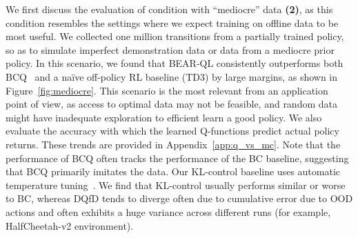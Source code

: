 We first discuss the evaluation of condition with ``mediocre'' data \textbf{(2)}, as this condition resembles the settings where we expect training on offline data to be most useful. We collected one million transitions from a partially trained policy, so as to simulate imperfect demonstration data or data from a mediocre prior policy.
In this scenario, we found that BEAR-QL consistently outperforms both BCQ~\cite{fujimoto2018off} and a na\"ive off-policy RL baseline (TD3) by large margins, as shown in Figure~\ref{fig:mediocre}. This scenario is the most relevant from an application point of view, as access to optimal data may not be feasible, and random data might have inadequate exploration to efficient learn a good policy. We also evaluate the accuracy with which the learned Q-functions predict actual policy returns. These trends are provided in Appendix~\ref{app:q_vs_mc}. Note that the performance of BCQ often tracks the performance of the BC baseline, suggesting that BCQ primarily imitates the data. Our KL-control baseline uses automatic temperature tuning~\citep{haarnoja2018sac}. We find that KL-control usually performs similar or worse to BC, whereas DQfD tends to diverge often due to cumulative error due to OOD actions and often exhibits a huge variance across different runs (for example, HalfCheetah-v2 environment). 


